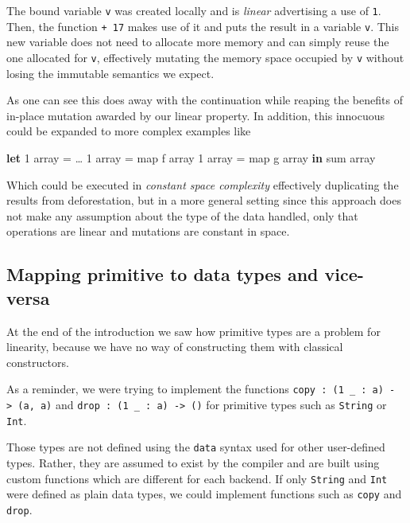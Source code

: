 \documentclass[
]{article}
\newenvironment{Shaded}{}{}
\newcommand{\DecValTok}[1]{\textcolor[rgb]{0.25,0.63,0.44}{#1}}
\newcommand{\FunctionTok}[1]{\textcolor[rgb]{0.02,0.16,0.49}{#1}}
\newcommand{\KeywordTok}[1]{\textcolor[rgb]{0.00,0.44,0.13}{\textbf{#1}}}
\newcommand{\NormalTok}[1]{#1}
\begin{document}
The bound variable \texttt{v} was created locally and is \emph{linear}
advertising a use of \texttt{1}. Then, the function \texttt{+\ 17} makes
use of it and puts the result in a variable
\texttt{v\textquotesingle{}}. This new variable does not need to
allocate more memory and can simply reuse the one allocated for
\texttt{v}, effectively mutating the memory space occupied by
\texttt{v\textquotesingle{}} without losing the immutable semantics we
expect.

As one can see this does away with the continuation while reaping the
benefits of in-place mutation awarded by our linear property. In
addition, this innocuous could be expanded to more complex examples like

\begin{Shaded}
\begin{Highlighting}[]
\KeywordTok{let} \DecValTok{1}\NormalTok{ array }\FunctionTok{=}\NormalTok{ …}
    \DecValTok{1}\NormalTok{ array\textquotesingle{} }\FunctionTok{=}\NormalTok{ map f array}
    \DecValTok{1}\NormalTok{ array\textquotesingle{}\textquotesingle{} }\FunctionTok{=}\NormalTok{ map g array\textquotesingle{}}
 \KeywordTok{in}\NormalTok{ sum array\textquotesingle{}\textquotesingle{}}
\end{Highlighting}
\end{Shaded}

Which could be executed in \emph{constant space complexity} effectively
duplicating the results from deforestation, but in a more general
setting since this approach does not make any assumption about the type
of the data handled, only that operations are linear and mutations are
constant in space.

\hypertarget{mapping-primitive-to-data-types-and-vice-versa}{%
\subsection{Mapping primitive to data types and
vice-versa}\label{mapping-primitive-to-data-types-and-vice-versa}}

At the end of the introduction we saw how primitive types are a problem
for linearity, because we have no way of constructing them with
classical constructors.

As a reminder, we were trying to implement the functions
\texttt{copy\ :\ (1\ \_\ :\ a)\ -\textgreater{}\ (a,\ a)} and
\texttt{drop\ :\ (1\ \_\ :\ a)\ -\textgreater{}\ ()} for primitive types
such as \texttt{String} or \texttt{Int}.

Those types are not defined using the \texttt{data} syntax used for
other user-defined types. Rather, they are assumed to exist by the
compiler and are built using custom functions which are different for
each backend. If only \texttt{String} and \texttt{Int} were defined as
plain data types, we could implement functions such as \texttt{copy} and
\texttt{drop}.
\end{document}
